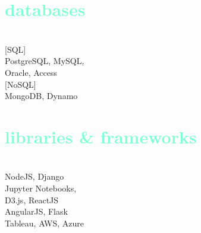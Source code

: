 \documentclass[english]{cv-style}          %
\begin{document}
\lastupdated



\begin{aside}
%
\vspace{5cm}
\section{\textcolor{aquamarine}{databases}}\\
\vspace{0.2cm}
{[SQL]}\\
{PostgreSQL, MySQL,\\
\vspace{0.1cm}
Oracle, Access}\\
\vspace{0.5cm}
{[NoSQL]}\\
{MongoDB, Dynamo}\\
%
\vspace{5cm}
\section{\textcolor{aquamarine}{libraries \& frameworks}}\\
\vspace{0.2cm}
{NodeJS, Django\\
\vspace{0.1cm}
Jupyter Notebooks,\\
\vspace{0.1cm}
D3.js, ReactJS\\
\vspace{0.1cm}
AngularJS, Flask\\
\vspace{0.1cm}
Tableau, AWS, Azure}\\
%
\end{aside}
\end{document}

